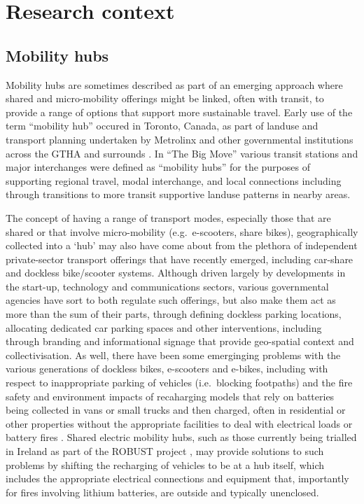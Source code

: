 \documentclass[preprint, 3p,
authoryear]{elsarticle} %
\begin{document}
\section{Research context}\label{research-context}

\subsection{Mobility hubs}\label{mobility-hubs}

Mobility hubs are sometimes described as part of an emerging approach
where shared and micro-mobility offerings might be linked, often with
transit, to provide a range of options that support more sustainable
travel. Early use of the term ``mobility hub'' occured in Toronto,
Canada, as part of landuse and transport planning undertaken by
Metrolinx and other governmental institutions across the GTHA and
surrounds \cite{Salsberg:2010aa, Engel-Yan:2012aa}. In ``The Big Move''
\cite{Metrolinx:2008aa} various transit stations and major interchanges
were defined as ``mobility hubs'' for the purposes of supporting
regional travel, modal interchange, and local connections including
through transitions to more transit supportive landuse patterns in
nearby areas.

The concept of having a range of transport modes, especially those that
are shared or that involve micro-mobility (e.g.~e-scooters, share
bikes), geographically collected into a `hub' may also have come about
from the plethora of independent private-sector transport offerings that
have recently emerged, including car-share and dockless bike/scooter
systems. Although driven largely by developments in the start-up,
technology and communications sectors, various governmental agencies
have sort to both regulate such offerings, but also make them act as
more than the sum of their parts, through defining dockless parking
locations, allocating dedicated car parking spaces and other
interventions, including through branding and informational signage that
provide geo-spatial context and collectivisation. As well, there have
been some emerginging problems with the various generations of dockless
bikes, e-scooters and e-bikes, including with respect to inappropriate
parking of vehicles (i.e.~blocking footpaths) and the fire safety and
environment impacts of recaharging models that rely on batteries being
collected in vans or small trucks and then charged, often in residential
or other properties without the appropriate facilities to deal with
electrical loads or battery fires \cite{Meigs:2023aa, Zhang:2022aa}.
Shared electric mobility hubs, such as those currently being trialled in
Ireland as part of the ROBUST project \cite{ROBUST:2025aa}, may provide
solutions to such problems by shifting the recharging of vehicles to be
at a hub itself, which includes the appropriate electrical connections
and equipment that, importantly for fires involving lithium batteries,
are outside and typically unenclosed.
\end{document}
